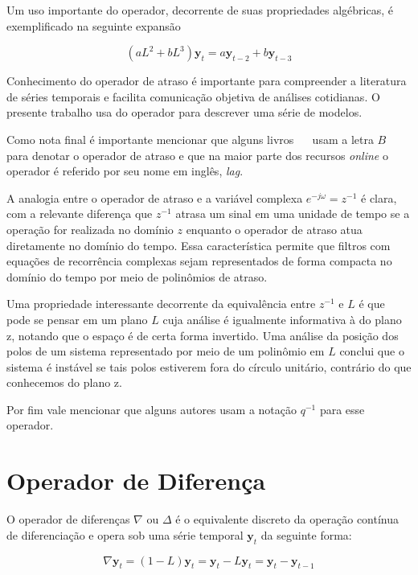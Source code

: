 \vspace{1cm}

Um uso importante do operador, decorrente de suas propriedades algébricas, é
exemplificado na seguinte expansão

$$ (aL^2 + bL^3) \mathbf{y}_{t} =  a\mathbf{y}_{t-2} + b\mathbf{y}_{t-3}$$

Conhecimento do operador de atraso é importante para compreender a literatura
de séries temporais e facilita comunicação objetiva de análises cotidianas.
O presente trabalho usa do operador para descrever uma série de modelos.

Como nota final é importante mencionar que alguns livros~\cite{chatfield}
~\cite{stoffer} usam a letra $B$ para denotar o operador de atraso e que na
maior parte dos recursos \emph{online} o operador é referido por seu nome em
inglês, \emph{lag}.

A analogia entre o operador de atraso e a variável complexa $e^{-j\omega} = z^{-1}$
é clara, com a relevante diferença que $z^{-1}$ atrasa um sinal em uma unidade
de tempo se a operação for realizada no domínio $z$ enquanto o operador de
atraso atua diretamente no domínio do tempo. Essa característica permite que
filtros com equações de recorrência complexas sejam representados de forma
compacta no domínio do tempo por meio de polinômios de atraso.

Uma propriedade interessante decorrente da equivalência entre $z^{-1}$ e $L$ é
que pode se pensar em um plano $L$ cuja análise é igualmente informativa à do
plano z, notando que o espaço é de certa forma invertido. Uma análise da
posição dos polos de um sistema representado por meio de um polinômio em $L$
conclui que o sistema é instável se tais polos estiverem fora do círculo unitário,
contrário do que conhecemos do plano z.

Por fim vale mencionar que alguns autores\cite{aguirre}\cite{algemlol}
usam a notação $q^{-1}$ para esse operador.

\section{Operador de Diferença}\label{sec:diff}

O operador de diferenças $\nabla$ ou  $\Delta$ é o equivalente discreto da
operação contínua de diferenciação e opera sob uma série temporal
$\mathbf{y}_t$ da seguinte forma:

$$ \nabla \mathbf{y}_t = (1 - L)\mathbf{y}_t = \mathbf{y}_t - L\mathbf{y}_t = \mathbf{y}_t - \mathbf{y}_{t-1} $$

